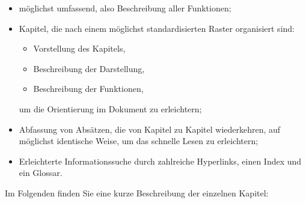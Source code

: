 {\begin{itemize} 
	\item möglichst umfassend, also Beschreibung aller Funktionen;%
	\item Kapitel, die nach einem möglichst standardisierten Raster organisiert sind:%
		\begin{itemize}
		\item[\textopenbullet] Vorstellung des Kapitels,%
		\item[\textopenbullet] Beschreibung der Darstellung,%
		\item[\textopenbullet] Beschreibung der Funktionen,%
		\end{itemize}
	um die Orientierung im Dokument zu erleichtern;%
	\item Abfassung von Absätzen, die von Kapitel zu Kapitel wiederkehren, auf möglichst identische Weise, um das schnelle Lesen zu erleichtern;%
	\item Erleichterte Informationssuche durch zahlreiche \gls{Hyperlinks}, einen Index und ein Glossar.%
\end{itemize}

Im Folgenden finden Sie eine kurze Beschreibung der einzelnen Kapitel:%

}
